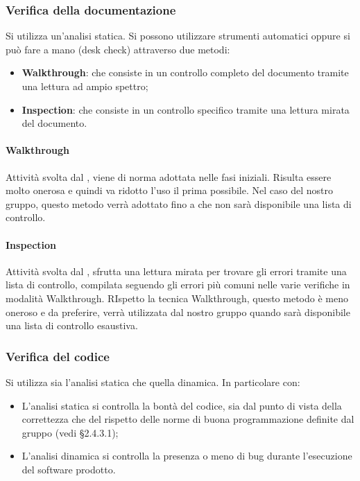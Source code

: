 \subsubsection{Verifica della documentazione}
Si utilizza un'analisi statica. Si possono utilizzare strumenti automatici oppure si può fare a mano (desk check) attraverso due metodi:
\begin{itemize}
\item \textbf{Walkthrough}: che consiste in un controllo completo del documento tramite una lettura ad ampio spettro;
\item \textbf{Inspection}: che consiste in un controllo specifico tramite una lettura mirata del documento.
\end{itemize}

\paragraph{Walkthrough}
Attività svolta dal \VE{}, viene di norma adottata nelle fasi iniziali. Risulta essere molto onerosa e quindi va ridotto l'uso il prima possibile. Nel caso del nostro gruppo, questo metodo verrà adottato fino a che non sarà disponibile una lista di controllo.

\paragraph{Inspection}
Attività svolta dal \VE{}, sfrutta una lettura mirata per trovare gli errori tramite una lista di controllo, compilata seguendo gli errori più comuni nelle varie verifiche in modalità Walkthrough. RIspetto la tecnica Walkthrough, questo metodo è meno oneroso e da preferire, verrà utilizzata dal nostro gruppo quando sarà disponibile una lista di controllo esaustiva.


\subsubsection{Verifica del codice}
Si utilizza sia l'analisi statica che quella dinamica. In particolare con:
\begin{itemize}
\item L'analisi statica si controlla la bontà del codice, sia dal punto di vista della correttezza che del rispetto delle norme di buona programmazione definite dal gruppo (vedi §2.4.3.1);
\item L'analisi dinamica si controlla la presenza o meno di bug durante l'esecuzione del software prodotto.
\end{itemize}

